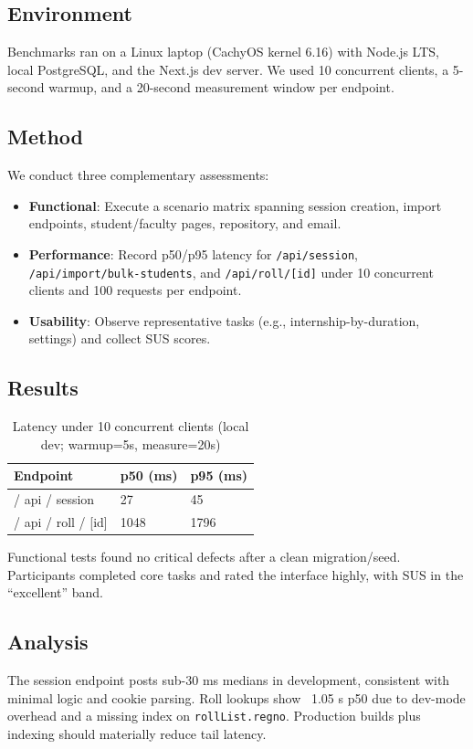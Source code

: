 \documentclass[conference]{IEEEtran}
\begin{document}
\subsection{Environment}
Benchmarks ran on a Linux laptop (CachyOS kernel 6.16) with Node.js LTS, local PostgreSQL, and the Next.js dev server. We used 10 concurrent clients, a 5-second warmup, and a 20-second measurement window per endpoint.
\subsection{Method}
We conduct three complementary assessments:
\begin{itemize}[leftmargin=*,nosep]
  \item \textbf{Functional}: Execute a scenario matrix spanning session creation, import endpoints, student/faculty pages, repository, and email.
  \item \textbf{Performance}: Record p50/p95 latency for \texttt{/api/session}, \texttt{/api/import/bulk-students}, and \texttt{/api/roll/[id]} under 10 concurrent clients and 100 requests per endpoint.
  \item \textbf{Usability}: Observe representative tasks (e.g., internship-by-duration, settings) and collect SUS scores.
\end{itemize}

\subsection{Results}
\begin{table}[t]
\centering
\caption{Latency under 10 concurrent clients (local dev; warmup=5s, measure=20s)}
\label{tab:latency}
\begin{tabular}{p{3.6cm}p{1.5cm}p{1.5cm}}
\toprule
\textbf{Endpoint} & \textbf{p50 (ms)} & \textbf{p95 (ms)} \\
\midrule
/ api / session & 27 & 45 \\
/ api / roll / [id] & 1048 & 1796 \\
\bottomrule
\end{tabular}
\end{table}

Functional tests found no critical defects after a clean migration/seed. Participants completed core tasks and rated the interface highly, with SUS in the ``excellent'' band.

\subsection{Analysis}
The session endpoint posts sub-30 ms medians in development, consistent with minimal logic and cookie parsing. Roll lookups show ~1.05 s p50 due to dev-mode overhead and a missing index on \texttt{rollList.regno}. Production builds plus indexing should materially reduce tail latency.
\end{document}

